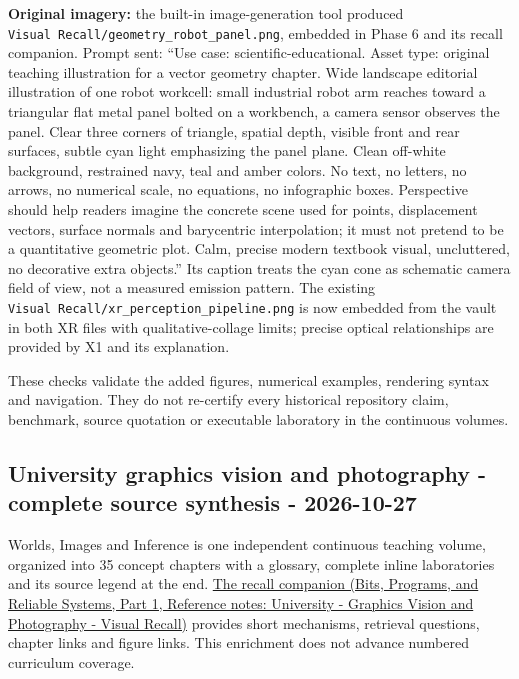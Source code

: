 \textbf{Original imagery:} the built-in image-generation tool produced \texttt{Visual\ Recall/geometry\_robot\_panel.png}, embedded in Phase 6 and its recall companion. Prompt sent: ``Use case: scientific-educational. Asset type: original teaching illustration for a vector geometry chapter. Wide landscape editorial illustration of one robot workcell: small industrial robot arm reaches toward a triangular flat metal panel bolted on a workbench, a camera sensor observes the panel. Clear three corners of triangle, spatial depth, visible front and rear surfaces, subtle cyan light emphasizing the panel plane. Clean off-white background, restrained navy, teal and amber colors. No text, no letters, no arrows, no numerical scale, no equations, no infographic boxes. Perspective should help readers imagine the concrete scene used for points, displacement vectors, surface normals and barycentric interpolation; it must not pretend to be a quantitative geometric plot. Calm, precise modern textbook visual, uncluttered, no decorative extra objects.'' Its caption treats the cyan cone as schematic camera field of view, not a measured emission pattern. The existing \texttt{Visual\ Recall/xr\_perception\_pipeline.png} is now embedded from the vault in both XR files with qualitative-collage limits; precise optical relationships are provided by X1 and its explanation.

These checks validate the added figures, numerical examples, rendering syntax and navigation. They do not re-certify every historical repository claim, benchmark, source quotation or executable laboratory in the continuous volumes.

\subsection{University graphics vision and photography - complete source synthesis - 2026-10-27}\label{appendix-a103e7846d21-university-graphics-vision-and-photography---complete-source-synthesis---2026-10-27}

\hypertarget{appendix-a103e7846d21-university-graphics-vision-and-photography---complete-source-synthesis---2026-10-27}{}

{Worlds, Images and Inference} is one independent continuous teaching volume, organized into 35 concept chapters with a glossary, complete inline laboratories and its source legend at the end. \href{../01-Bits-Programs-and-Reliable-Systems-P01/main.pdf\#nameddest=appendix-a8f634b076b5}{The recall companion (Bits, Programs, and Reliable Systems, Part 1, Reference notes: University - Graphics Vision and Photography - Visual Recall)} provides short mechanisms, retrieval questions, chapter links and figure links. This enrichment does not advance numbered curriculum coverage.

